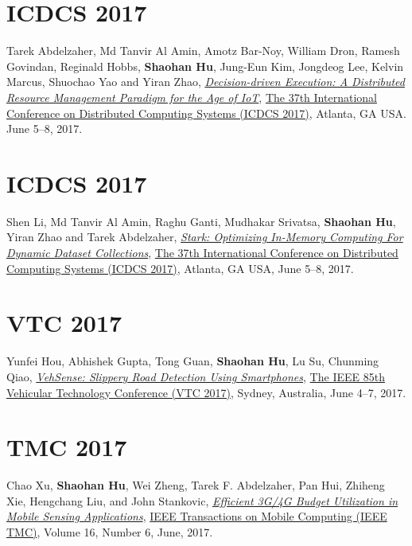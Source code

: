 \section{\sc ICDCS 2017}\hypertarget{abdelzaher2017icdcs}{}
Tarek Abdelzaher, Md Tanvir Al Amin, Amotz Bar-Noy, William Dron, Ramesh Govindan, Reginald Hobbs, \textbf{Shaohan Hu}, Jung-Eun Kim, Jongdeog Lee, Kelvin Marcus, Shuochao Yao and Yiran Zhao,
\href{http://ieeexplore.ieee.org/document/7980121}{\emph{Decision-driven Execution: A Distributed Resource Management Paradigm for the Age of IoT}},
\href{http://icdcs2017.gatech.edu/}{\textsf{The 37th International Conference on Distributed Computing Systems (ICDCS 2017)}},
Atlanta, GA USA. June 5--8, 2017.

\section{\sc ICDCS 2017}\hypertarget{li2017icdcs}{}
Shen Li, Md Tanvir Al Amin, Raghu Ganti, Mudhakar Srivatsa, \textbf{Shaohan Hu}, Yiran Zhao and Tarek Abdelzaher,
\href{http://ieeexplore.ieee.org/document/7979959}{\emph{Stark: Optimizing In-Memory Computing For Dynamic Dataset Collections}},
\href{http://icdcs2017.gatech.edu/}{\textsf{The 37th International Conference on Distributed Computing Systems (ICDCS 2017)}},
Atlanta, GA USA, June 5--8, 2017.

\section{\sc VTC 2017}\hypertarget{hou2017vtc}{}
Yunfei Hou, Abhishek Gupta, Tong Guan, \textbf{Shaohan Hu}, Lu Su, Chunming Qiao,
\href{https://arxiv.org/abs/1705.03955}{\emph{VehSense: Slippery Road Detection Using Smartphones}},
\href{http://ieeevtc.org/vtc2017spring}{\textsf{The IEEE 85th Vehicular Technology Conference (VTC 2017)}},
Sydney, Australia, June 4--7, 2017.

\section{\sc TMC 2017}\hypertarget{xu2017tmc}{}
Chao Xu, \textbf{Shaohan Hu}, Wei Zheng, Tarek F. Abdelzaher, Pan Hui, Zhiheng Xie, Hengchang Liu, and John Stankovic,
\href{http://ieeexplore.ieee.org/document/7539667}{\emph{Efficient 3G/4G Budget Utilization in Mobile Sensing Applications}},
\href{http://www.computer.org/web/tmc}{\textsf{IEEE Transactions on Mobile Computing (IEEE TMC)}},
Volume 16, Number 6, June, 2017.


